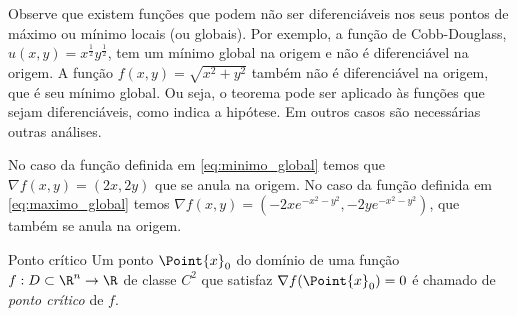 Observe que existem funções que podem não ser diferenciáveis nos seus pontos de máximo ou mínimo locais (ou globais). Por exemplo, a função de Cobb-Douglass, $u(x,y)=x^{\frac{1}{2}}y^{\frac{1}{2}}$, tem um mínimo global na origem e não é diferenciável na origem. A função $f(x,y)=\sqrt{x^2+y^2}$ também não é diferenciável na origem, que é seu mínimo global. Ou seja, o teorema pode ser aplicado às funções que sejam diferenciáveis, como indica a hipótese. Em outros casos são necessárias outras análises. 

\begin{example}{}{}
No caso da função definida em \eqref{eq:minimo_global}  temos que $\nabla f (x,y)=(2x,2y)$ que se anula na origem. No caso da função definida em \eqref{eq:maximo_global} temos $\nabla f(x,y)=\left(-2xe^{-x^2-y^2},-2ye^{-x^2-y^2}\right)$, que também se anula na origem. 
\end{example}

\begin{definition}{Ponto crítico}{}
    Um ponto $\Point{x}_0$ do domínio de uma função $f:D\subset \R^n\to\R$ de classe $C^2$ que satisfaz $\nabla f (\Point{x}_0)=0 $ é chamado de \textit{ponto crítico} de $f$. 
\end{definition}

